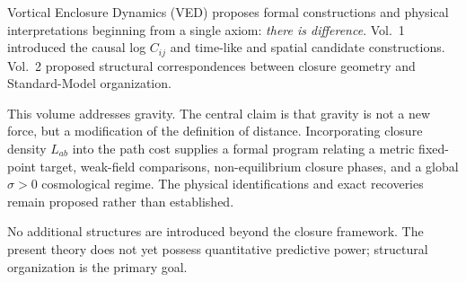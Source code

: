 Vortical Enclosure Dynamics (VED) proposes formal constructions and physical
interpretations beginning from a single axiom:
\emph{there is difference}.
Vol.~1 introduced the causal log $C_{ij}$ and time-like and spatial candidate
constructions.  Vol.~2 proposed structural correspondences between closure
geometry and Standard-Model organization.

This volume addresses gravity.
The central claim is that gravity is not a new force,
but a modification of the definition of distance.
Incorporating closure density $L_{ab}$ into the path cost supplies a formal
program relating a metric fixed-point target, weak-field comparisons,
non-equilibrium closure phases, and a global $\sigma>0$ cosmological regime.
The physical identifications and exact recoveries remain proposed rather than
established.

No additional structures are introduced beyond the closure framework.
The present theory does not yet possess quantitative predictive power;
structural organization is the primary goal.
